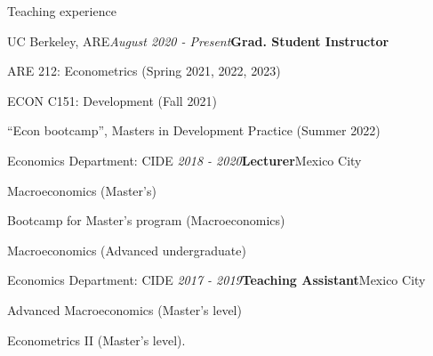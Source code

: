 \documentclass{resume} %
\begin{document}
\begin{rSection}{Teaching experience}

\begin{rSubsection}{UC Berkeley, ARE}{\textit{August 2020 - Present}}{\textbf{Grad. Student Instructor}}{}
\item[] ARE 212: Econometrics (Spring 2021, 2022, 2023)
\item[] ECON C151: Development (Fall 2021)
\item[] ``Econ bootcamp'', Masters in Development Practice (Summer 2022)
\end{rSubsection}

\begin{rSubsection}{Economics Department: CIDE}{\textit{ 2018 -  2020}}{\textbf{Lecturer}}{Mexico City}
\item[] Macroeconomics (Master's)
\item[] Bootcamp for Master's program (Macroeconomics)
\item[] Macroeconomics (Advanced undergraduate)
\end{rSubsection}

\begin{rSubsection}{Economics Department: CIDE}{\textit{ 2017 - 2019}}{\textbf{Teaching Assistant}}{Mexico City}
\item[] Advanced Macroeconomics (Master's level) 
\item[] Econometrics II (Master's level).
\end{rSubsection}

\end{rSection}
\end{document}
